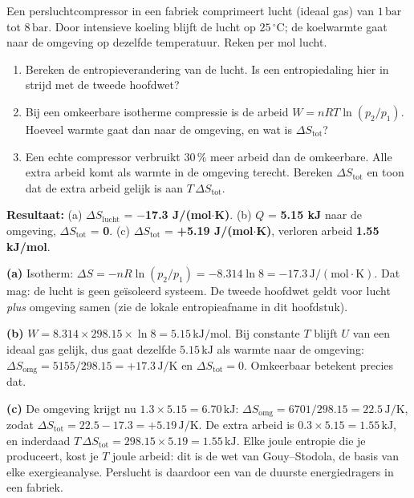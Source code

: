 \begin{oefening}
Een persluchtcompressor in een fabriek comprimeert lucht (ideaal gas) van \(1\,\mathrm{bar}\) tot \(8\,\mathrm{bar}\). Door intensieve koeling blijft de lucht op \(25\,^\circ\mathrm{C}\); de koelwarmte gaat naar de omgeving op dezelfde temperatuur. Reken per mol lucht.

\begin{enumerate}
\item[(a)]
  Bereken de entropieverandering van de lucht. Is een entropiedaling hier in strijd met de tweede hoofdwet?
\item[(b)]
  Bij een omkeerbare isotherme compressie is de arbeid \(W = nRT\ln(p_2/p_1)\). Hoeveel warmte gaat dan naar de omgeving, en wat is \(\Delta S_{\text{tot}}\)?
\item[(c)]
  Een echte compressor verbruikt \(30\,\%\) meer arbeid dan de omkeerbare. Alle extra arbeid komt als warmte in de omgeving terecht. Bereken \(\Delta S_{\text{tot}}\) en toon dat de extra arbeid gelijk is aan \(T\,\Delta S_{\text{tot}}\).
\end{enumerate}
\end{oefening}
\begin{oplossing}
\textbf{Resultaat:} (a) \(\Delta S_{\text{lucht}}\) = \textbf{\ensuremath{-}17.3 J/(mol\ensuremath{\cdot{}}K)}. (b) \(Q\) = \textbf{5.15 kJ} naar de omgeving, \(\Delta S_{\text{tot}}\) = \textbf{0}. (c) \(\Delta S_{\text{tot}}\) = \textbf{+5.19 J/(mol\ensuremath{\cdot{}}K)}, verloren arbeid \textbf{1.55 kJ/mol}.

\textbf{(a)} Isotherm: \(\Delta S = -nR\ln(p_2/p_1) = -8.314\ln 8 = -17.3\,\mathrm{J/(mol\cdot K)}\). Dat mag: de lucht is geen geïsoleerd systeem. De tweede hoofdwet geldt voor lucht \emph{plus} omgeving samen (zie de lokale entropieafname in dit hoofdstuk).

\textbf{(b)} \(W = 8.314 \times 298.15 \times \ln 8 = 5.15\,\mathrm{kJ/mol}\). Bij constante \(T\) blijft \(U\) van een ideaal gas gelijk, dus gaat dezelfde \(5.15\,\mathrm{kJ}\) als warmte naar de omgeving: \(\Delta S_{\text{omg}} = 5155/298.15 = +17.3\,\mathrm{J/K}\) en \(\Delta S_{\text{tot}} = 0\). Omkeerbaar betekent precies dat.

\textbf{(c)} De omgeving krijgt nu \(1.3 \times 5.15 = 6.70\,\mathrm{kJ}\): \(\Delta S_{\text{omg}} = 6701/298.15 = 22.5\,\mathrm{J/K}\), zodat \(\Delta S_{\text{tot}} = 22.5 - 17.3 = +5.19\,\mathrm{J/K}\). De extra arbeid is \(0.3 \times 5.15 = 1.55\,\mathrm{kJ}\), en inderdaad \(T\,\Delta S_{\text{tot}} = 298.15 \times 5.19 = 1.55\,\mathrm{kJ}\). Elke joule entropie die je produceert, kost je \(T\) joule arbeid: dit is de wet van Gouy--Stodola, de basis van elke exergieanalyse. Perslucht is daardoor een van de duurste energiedragers in een fabriek.
\end{oplossing}

